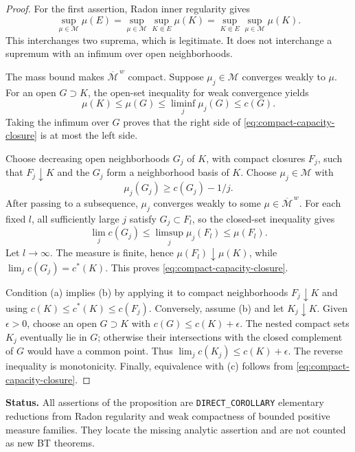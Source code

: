 \documentclass[11pt,a4paper]{article}
\numberwithin{equation}{section}
\theoremstyle{definition}
\theoremstyle{remark}
\begin{document}
\begin{proof}
For the first assertion, Radon inner regularity gives
\[
 \sup_{\mu\in\mathcal M}\mu(E)
  =\sup_{\mu\in\mathcal M}
       \sup_{K\Subset E}\mu(K)
  =\sup_{K\Subset E}\sup_{\mu\in\mathcal M}\mu(K).
\]
This interchanges two suprema, which is legitimate. It does not
interchange a supremum with an infimum over open neighborhoods.

The mass bound makes $\overline{\mathcal M}^{\,w}$ compact. Suppose
$\mu_j\in\mathcal M$ converges weakly to $\mu$. For an open
$G\supset K$, the open-set inequality for weak convergence yields
\[
 \mu(K)\leq\mu(G)\leq\liminf_j\mu_j(G)\leq c(G).
\]
Taking the infimum over $G$ proves that the right side of
\eqref{eq:compact-capacity-closure} is at most the left side.

Choose decreasing open neighborhoods $G_j$ of $K$, with compact
closures $F_j$, such that $F_j\downarrow K$ and the $G_j$ form a
neighborhood basis of $K$. Choose $\mu_j\in\mathcal M$ with
\[
 \mu_j(G_j)\geq c(G_j)-1/j.
\]
After passing to a subsequence, $\mu_j$ converges weakly to some
$\mu\in\overline{\mathcal M}^{\,w}$. For each fixed $l$, all
sufficiently large $j$ satisfy $G_j\subset F_l$, so the closed-set
inequality gives
\[
 \lim_j c(G_j)
 \leq\limsup_j\mu_j(F_l)\leq\mu(F_l).
\]
Let $l\to\infty$. The measure is finite, hence
$\mu(F_l)\downarrow\mu(K)$, while
$\lim_jc(G_j)=c^*(K)$. This proves
\eqref{eq:compact-capacity-closure}.

Condition (a) implies (b) by applying it to compact neighborhoods
$F_j\downarrow K$ and using $c(K)\leq c^*(K)\leq c(F_j)$.
Conversely, assume (b) and let $K_j\downarrow K$. Given $\epsilon>0$,
choose an open $G\supset K$ with $c(G)\leq c(K)+\epsilon$.
The nested compact sets $K_j$ eventually lie in $G$; otherwise their
intersections with the closed complement of $G$ would have a common
point. Thus $\lim_jc(K_j)\leq c(K)+\epsilon$. The reverse inequality
is monotonicity. Finally, equivalence with (c) follows from
\eqref{eq:compact-capacity-closure}.
\end{proof}

\noindent\textbf{Status.} All assertions of the proposition are
\texttt{DIRECT\_COROLLARY} elementary reductions from Radon regularity
and weak compactness of bounded positive measure families. They locate
the missing analytic assertion and are not counted as new BT theorems.
\end{document}

